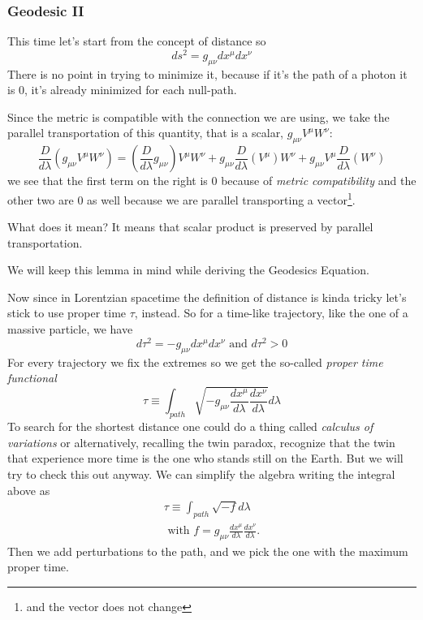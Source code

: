 \subsubsection{Geodesic II}

This time let's start from the concept of distance so
\[
ds^{2} = g_{\mu \nu } dx^{\mu }dx^{\nu }
\]
There is no point in trying to minimize it, because if it's the path of a photon it is 0, it's already minimized for each null-path.\par
Since the metric is compatible with the connection we are using, we take the parallel transportation of this quantity, that is a scalar, $g_{\mu \nu }V^{\mu }W^{\nu }$:
\begin{equation}
\frac{D}{d\lambda } \left( g_{\mu \nu }V^{\mu }W^{\nu }	 \right) = \left( \frac{D}{d\lambda } g_{\mu \nu } \right)V^{\mu }W^{\nu } + g_{\mu \nu } \frac{D}{d\lambda }\left( V^{\mu }\right)W^{\nu }+ g_{\mu \nu} V^{\mu } \frac{D }{d \lambda } \left( W^{\nu } \right)
\end{equation}
we see that the first term on the right is 0 because of \emph{metric compatibility} and the other two are 0 as well because we are parallel transporting a vector\footnote{and the vector does not change}.\par
What does it mean? It means that scalar product is preserved by parallel transportation.\par
We will keep this lemma in mind while deriving the Geodesics Equation.

Now since in Lorentzian spacetime the definition of distance is kinda tricky let's stick to use proper time $\tau $, instead. So for a time-like trajectory, like the one of a massive particle, we have
\[
d\tau ^{2}= -g_{\mu \nu }dx^{\mu }dx^{\nu } \text{ and } d\tau ^{2}> 0
\]
For every trajectory we fix the extremes so we get the so-called \emph{proper time functional}
\[
\tau \equiv \int_{path}^{}\sqrt{-g_{\mu \nu } \frac{d x^{\mu }}{d \lambda } \frac{d x^{\nu }}{d \lambda }} d\lambda 	
\]
To search for the shortest distance one could do a thing called \emph{calculus of variations} or alternatively, recalling the twin paradox, recognize that the twin that experience more time is the one who stands still on the Earth. But we will try to check this out anyway.  We can simplify the algebra writing the integral above as
\begin{gather*}
	\tau  \equiv \int_{path}^{}{\sqrt{-f} d\lambda } \\
	\text{ with } f = g_{\mu \nu } \frac{d x^{\mu }}{d \lambda } \frac{d x^{\nu }}{d \lambda }.
\end{gather*}
Then we add perturbations to the path, and we pick the one with the maximum proper time.

